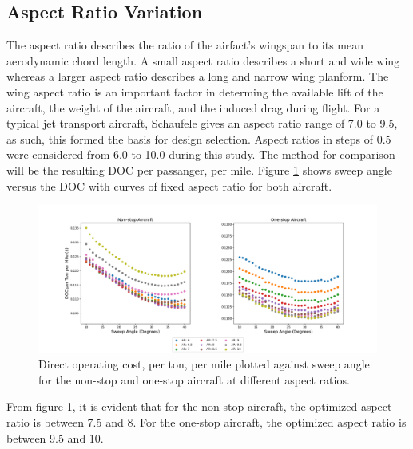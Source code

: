 \documentclass{article}
\begin{document}
    \subsection{Aspect Ratio Variation}
        \begin{flushleft}
            The aspect ratio describes the ratio of the airfact's wingspan to
            its mean aerodynamic chord length. A small aspect ratio describes a
            short and wide wing whereas a larger aspect ratio describes a long
            and narrow wing planform. The wing aspect ratio is an important
            factor in determing the available lift of the aircraft, the weight
            of the aircraft, and the induced drag during flight. For a typical
            jet transport aircraft, Schaufele gives an aspect ratio range of 7.0
            to 9.5, as such, this formed the basis for design selection. Aspect
            ratios in steps of 0.5 were considered from 6.0 to 10.0 during this
            study. The method for comparison will be the resulting DOC per
            passanger, per mile. Figure \ref{fig:doctmAR} shows sweep angle versus
            the DOC with curves of fixed aspect ratio for both aircraft.
            \begin{figure}[ht]
                \centering
                \includegraphics[scale=0.4]{DOCTM v Sweep Angle.PNG}
                \caption{Direct operating cost, per ton, per mile plotted against sweep angle for the non-stop and one-stop aircraft at different aspect ratios.}
                \label{fig:doctmAR}
            \end{figure}

            From figure \ref{fig:doctmAR}, it is evident that for the non-stop
            aircraft, the optimized aspect ratio is between 7.5 and 8. For the
            one-stop aircraft, the optimized aspect ratio is between 9.5 and 10.
        \end{flushleft}
\end{document}

